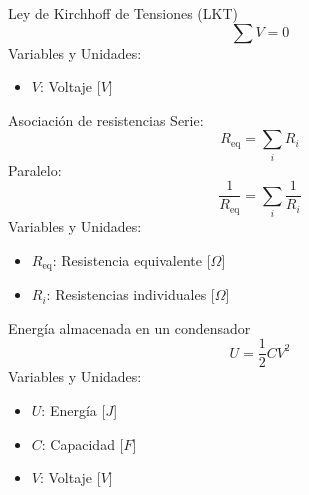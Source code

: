 \begin{landscape}
\begin{multicols}{3}
\begin{teorema}{Ley de Kirchhoff de Tensiones (LKT)}
    $$\sum V = 0$$
    Variables y Unidades:
    \begin{itemize}
        \item $V$: Voltaje [$V$]
    \end{itemize}
\end{teorema}

\columnbreak

\begin{teorema}{Asociación de resistencias}
    Serie: $$R_{\text{eq}} = \sum_i R_i$$
    Paralelo: $$\frac{1}{R_{\text{eq}}} = \sum_i \frac{1}{R_i}$$
    Variables y Unidades:
    \begin{itemize}
        \item $R_{\text{eq}}$: Resistencia equivalente [$\Omega$]
        \item $R_i$: Resistencias individuales [$\Omega$]
    \end{itemize}
\end{teorema}

\begin{teorema}{Energía almacenada en un condensador}
    $$U = \frac{1}{2} C V^2$$
    Variables y Unidades:
    \begin{itemize}
        \item $U$: Energía [$J$]
        \item $C$: Capacidad [$F$]
        \item $V$: Voltaje [$V$]
    \end{itemize}
\end{teorema}

\end{multicols}
\end{landscape}

